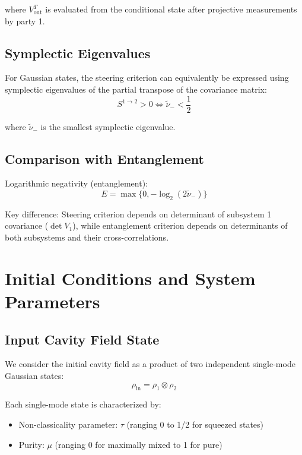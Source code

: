 where $V_{\text{out}}^T$ is evaluated from the conditional state after projective measurements by party 1.

\subsection{Symplectic Eigenvalues}

For Gaussian states, the steering criterion can equivalently be expressed using symplectic eigenvalues of the partial transpose of the covariance matrix:
\begin{equation}
S^{1 \to 2} > 0 \iff \tilde{\nu}_- < \frac{1}{2}
\end{equation}

where $\tilde{\nu}_-$ is the smallest symplectic eigenvalue.

\subsection{Comparison with Entanglement}

Logarithmic negativity (entanglement):
\begin{equation}
E = \max\{0, -\log_2(2\tilde{\nu}_-)\}
\end{equation}

Key difference: Steering criterion depends on determinant of subsystem 1 covariance ($\det V_1$), while entanglement criterion depends on determinants of both subsystems and their cross-correlations.

\section{Initial Conditions and System Parameters}

\subsection{Input Cavity Field State}

We consider the initial cavity field as a product of two independent single-mode Gaussian states:
\begin{equation}
\rho_{\text{in}} = \rho_1 \otimes \rho_2
\end{equation}

Each single-mode state is characterized by:
\begin{itemize}
	\item Non-classicality parameter: $\tau$ (ranging 0 to 1/2 for squeezed states)
	\item Purity: $\mu$ (ranging 0 for maximally mixed to 1 for pure)
\end{itemize}

